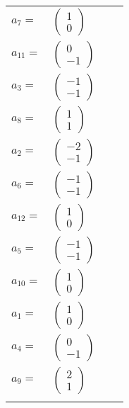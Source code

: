 \documentclass[1p]{elsarticle_modified}
\theoremstyle{definition}
\begin{document}
\begin{tabular}{m{7pt} m{180pt} m{7pt} m{180pt} }
\flushright $a_{7}=$&$\begin{pmatrix}1\\0\end{pmatrix}$ \\
\flushright $a_{11}=$&$\begin{pmatrix}0\\-1\end{pmatrix}$ \\
\flushright $a_{3}=$&$\begin{pmatrix}-1\\-1\end{pmatrix}$ \\
\flushright $a_{8}=$&$\begin{pmatrix}1\\1\end{pmatrix}$ \\
\flushright $a_{2}=$&$\begin{pmatrix}-2\\-1\end{pmatrix}$ \\
\flushright $a_{6}=$&$\begin{pmatrix}-1\\-1\end{pmatrix}$ \\
\flushright $a_{12}=$&$\begin{pmatrix}1\\0\end{pmatrix}$ \\
\flushright $a_{5}=$&$\begin{pmatrix}-1\\-1\end{pmatrix}$ \\
\flushright $a_{10}=$&$\begin{pmatrix}1\\0\end{pmatrix}$ \\
\flushright $a_{1}=$&$\begin{pmatrix}1\\0\end{pmatrix}$ \\
\flushright $a_{4}=$&$\begin{pmatrix}0\\-1\end{pmatrix}$ \\
\flushright $a_{9}=$&$\begin{pmatrix}2\\1\end{pmatrix}$\\&\end{tabular}
\end{document}
